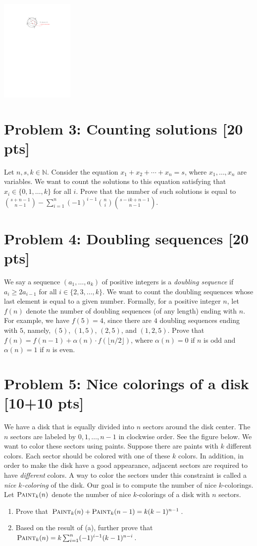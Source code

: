 \documentclass[11pt,twoside]{article}
\newcommand{\problem}[1]{\section*{Problem #1}}
\begin{document}
\begin{center}
    \includegraphics[height=5cm]{hw-fig-intersection.pdf}
\end{center}

\problem{3: Counting solutions [20 pts]}
Let $n,s,k \in \mathbb{N}$.
Consider the equation $x_1+x_2+\cdots+x_n = s$, where $x_1,\dots,x_n$ are variables.
We want to count the solutions to this equation satisfying that $x_i \in \{0,1,\dots,k\}$ for all $i$.
Prove that the number of such solutions is equal to $\binom{s+n-1}{n-1} - \sum_{i=1}^n (-1)^{i-1} \binom{n}{i} \binom{s-ik+n-1}{n-1}$.

\problem{4: Doubling sequences [20 pts]} 
We say a sequence $(a_1,\dots,a_k)$ of positive integers is a \textit{doubling sequence} if $a_i \geq 2a_{i-1}$ for all $i \in \{2,3,\dots,k\}$.
We want to count the doubling sequences whose last element is equal to a given number.
Formally, for a positive integer $n$, let $f(n)$ denote the number of doubling sequences (of any length) ending with $n$.
For example, we have $f(5) = 4$, since there are $4$ doubling sequences ending with $5$, namely, $(5)$, $(1,5)$, $(2,5)$, and $(1,2,5)$.
Prove that $f(n) = f(n-1) + \alpha(n) \cdot f(\lfloor n/2 \rfloor)$, where $\alpha(n) = 0$ if $n$ is odd and $\alpha(n) = 1$ if $n$ is even.

\problem{5: Nice colorings of a disk [10+10 pts]} 
We have a disk that is equally divided into $n$ sectors around the disk center.
The $n$ sectors are labeled by $0,1,\dots,n-1$ in clockwise order.
See the figure below.
We want to color these sectors using paints.
Suppose there are paints with $k$ different colors.
Each sector should be colored with one of these $k$ colors.
In addition, in order to make the disk have a good appearance, adjacent sectors are required to have \textit{different} colors.
A way to color the sectors under this constraint is called a \textit{nice $k$-coloring} of the disk.
Our goal is to compute the number of nice $k$-colorings.
Let $\textsc{Paint}_k(n)$ denote the number of nice $k$-colorings of a disk with $n$ sectors.
\begin{enumerate}
    \item Prove that $\textsc{Paint}_k(n) + \textsc{Paint}_k(n-1) = k(k-1)^{n-1}$.
    \item Based on the result of (a), further prove that $\textsc{Paint}_k(n) = k \sum_{i=1}^{n} (-1)^{i-1} (k-1)^{n-i}$.
\end{enumerate}
\end{document}
